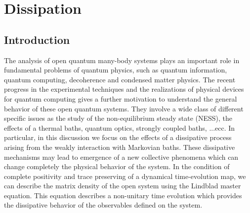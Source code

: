 \chapter{Dissipation}
\label{chp_diss}


\section{Introduction}

The analysis of open quantum many-body systems plays an important role in fundamental problems of quantum physics, such as quantum information, quantum computing, decoherence and condensed matter physics. The recent progress in the experimental techniques and the realizations of physical devices for quantum computing gives a further motivation to understand the general behavior of these open quantum systems. They involve a wide class of different specific issues as the study of the non-equilibrium steady state (NESS), the effects of a thermal baths, quantum optics, strongly coupled baths, ...ecc. In particular, in this discussion we focus on the effects of a dissipative process arising from the weakly interaction with Markovian baths. These dissipative mechanisms may lead to emergence of a new collective phenomena which can change completely the physical behavior of the system. In the condition of complete positivity and trace preserving of a dynamical time-evolution map, we can describe the matrix density of the open system using the Lindblad master equation. This equation describes a non-unitary time evolution which provides the dissipative behavior of the observables defined on the system. \\ 
